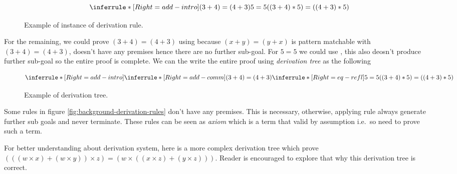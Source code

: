 \documentclass[master.tex]{subfiles}
\begin{document}
\begin{figure}[H]
\centering
$$ \derivTree{add-intro}{((3 + 4) * 5) = ((4 + 3) * 5)}{(3 + 4) = (4 + 3) \\ 5 = 5} $$
\caption{Example of instance of derivation rule.}
\end{figure}

For the remaining, we could prove $(3 + 4) = (4 + 3)$ using
 because $(x + y) = (y + x)$ is pattern matchable with $(3
+ 4) = (4 + 3)$,  doesn't have any premises hence there are
no further sub-goal. For $5 = 5$ we could use , this also
deosn't produce further sub-goal so the entire proof is complete. We can the
write the entire proof using \emph{derivation tree} as the following

\begin{figure}[H]
\centering
$$ \derivTree{add-intro}{((3 + 4) * 5) = ((4 + 3) * 5)}
     {\derivTree{add-comm}{(3 + 4) = (4 + 3)}{ } \\ \\ \\
      \derivTree{eq-refl}{5 = 5}{ }} $$
\caption{Example of derivation tree.}
\label{fig:background-derivation-tree-1}
\end{figure}

Some rules in figure \ref{fig:background-derivation-rules} don't have any
premises. This is necessary, otherwise, applying rule always generate further
sub goals and never terminate. These rules can be seen as \emph{axiom} which is
a term that valid by assumption i.e.\ so need to prove such a term.

For better understanding about derivation system, here is a more complex
derivation tree which prove $(((w \times x) + (w \times y)) \times z) = (w \times ((x \times z) + (y
\times z)))$. Reader is encouraged to explore that why this derivation tree is
correct.
\end{document}
